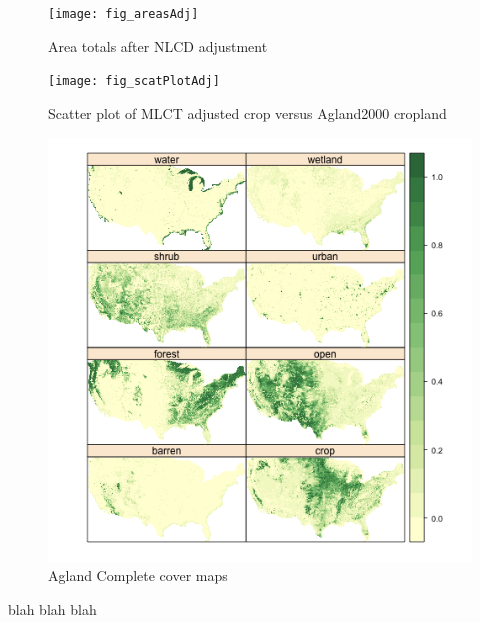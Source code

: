 \begin{figure}[hpt]
  \centering


  \texttt{[image: fig\_areasAdj]}
  \caption{Area totals after NLCD adjustment}
  \label{fig:areasAdj}
\end{figure}

\begin{figure}[hpt] 
  \begin{center} 


    \texttt{[image: fig\_scatPlotAdj]}
  \end{center} 
  \caption{Scatter plot of MLCT adjusted crop versus Agland2000 cropland}
  \label{fig:scatPlotAdj} 
\end{figure} 





\begin{figure}[hpt] 
\begin{center} 


\includegraphics{fig_agc}
\end{center} 
\caption{Agland Complete cover maps} 
\label{fig:agc} 
\end{figure} 



blah blah blah

